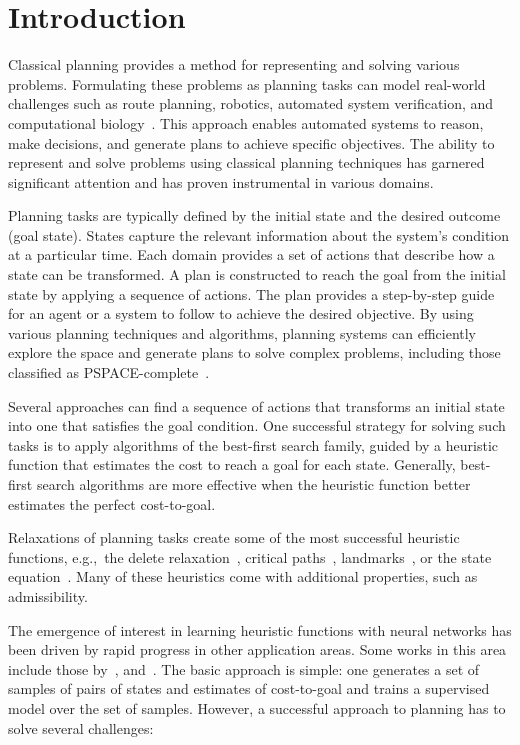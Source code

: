 \chapter{Introduction}
\label{chapter:introduction}

Classical planning provides a method for representing and solving various problems. Formulating these problems as planning tasks can model real-world challenges such as route planning, robotics, automated system verification, and computational biology~\cite{edelkamp2012heuristic}. This approach enables automated systems to reason, make decisions, and generate plans to achieve specific objectives. The ability to represent and solve problems using classical planning techniques has garnered significant attention and has proven instrumental in various domains.

Planning tasks are typically defined by the initial state and the desired outcome (goal state). States capture the relevant information about the system's condition at a particular time. Each domain provides a set of actions that describe how a state can be transformed. A plan is constructed to reach the goal from the initial state by applying a sequence of actions. The plan provides a step-by-step guide for an agent or a system to follow to achieve the desired objective. By using various planning techniques and algorithms, planning systems can efficiently explore the space and generate plans to solve complex problems, including those classified as PSPACE-complete~\cite{bylander1994computational}.

Several approaches can find a sequence of actions that transforms an initial state into one that satisfies the goal condition. One successful strategy for solving such tasks is to apply algorithms of the best-first search family, guided by a heuristic function that estimates the cost to reach a goal for each state. Generally, best-first search algorithms are more effective when the heuristic function better estimates the perfect cost-to-goal.

Relaxations of planning tasks create some of the most successful heuristic functions, e.g.,~the delete relaxation~\cite{hoffmann2001ff}, critical paths~\cite{haslum2004admissible}, landmarks~\cite{karpas2009cost,hoffmann2004ordered}, or the state equation~\cite{bonet2013admissible}. Many of these heuristics come with additional properties, such as admissibility.

The emergence of interest in learning heuristic functions with neural networks has been driven by rapid progress in other application areas. Some works in this area include those by~\citet{samadi2008learning,arfaee2011learning,agostinelli2019solving,yu2020learning,shen2020learning,ferber2020neural,toyer2020asnets,ferber2022neural}, and~\citet{otoole2022sampling}. The basic approach is simple: one generates a set of samples of pairs of states and estimates of cost-to-goal and trains a supervised model over the set of samples. However, a successful approach to planning has to solve several challenges:

